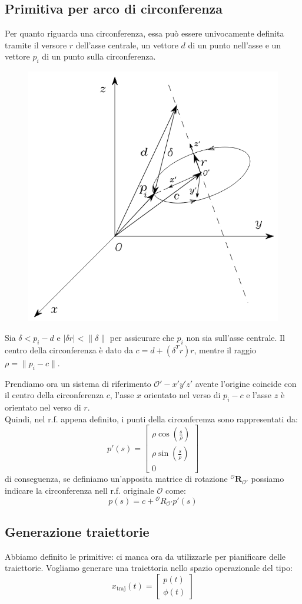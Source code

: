 \subsection{Primitiva per arco di circonferenza}
Per quanto riguarda una circonferenza, essa può essere univocamente definita tramite il versore $r$ dell'asse centrale, un vettore $d$ di un punto nell'asse e un vettore $p_i$ di un punto sulla circonferenza.

\begin{figure}[!ht]
	\centering
	\includegraphics[width=0.5\linewidth]{images/trajectories_18}
	\caption{}
	\label{fig:trajectories18}
\end{figure}

Sia $\delta < p_i - d$ e $|\delta r| < \|\delta\|$ per assicurare che $p_i$ non sia sull'asse centrale. Il centro della circonferenza è dato da $c = d+ (\delta^T r)r$, mentre il raggio $\rho = \|p_i - c\|$.

Prendiamo ora un sistema di riferimento $\mathcal{O}'-x'y'z'$ avente l'origine coincide con il centro della circonferenza $c$, l'asse $x$ orientato nel verso di $p_i - c$ e l'asse $z$ è orientato nel verso di $r$.\\
Quindi, nel r.f. appena definito, i punti della circonferenza sono rappresentati da:
$$
p'(s)
=
\begin{bmatrix}
\rho \cos(\frac{s}{\rho}) \\[5pt]
\rho \sin(\frac{s}{\rho}) \\[5pt]
0
\end{bmatrix}
$$
di conseguenza, se definiamo un'apposita matrice di rotazione ${}^\mathcal{O}\bm{R}_{\mathcal{O}'}$ possiamo indicare la circonferenza nell r.f. originale $\mathcal{O}$ come:
$$
p(s) = c + {}^\mathcal{O}R_{\mathcal{O}'} p'(s)
$$


\subsection{Generazione traiettorie}
Abbiamo definito le primitive: ci manca ora da utilizzarle per pianificare delle traiettorie. Vogliamo generare una traiettoria nello spazio operazionale del tipo:
$$
x_{\text{traj}}(t) =
\begin{bmatrix*}
p(t) \\ \phi(t)
\end{bmatrix*}
$$

